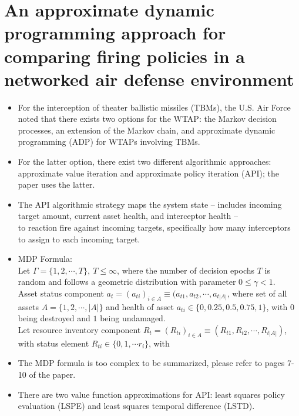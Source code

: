 \documentclass[12pt]{article} %
\renewcommand\le{\leqslant}
\begin{document}
\section*{An approximate dynamic programming approach for comparing firing policies in a networked air defense environment \cite{Summers2020AnAD}}
\begin{itemize}
    \item For the interception of theater ballistic missiles (TBMs), the U.S. Air Force noted that there exists two options for the WTAP: the Markov decision processes, an extension of the Markov chain, and approximate dynamic programming (ADP) for WTAPs involving TBMs.
    \item For the latter option, there exist two different algorithmic approaches: approximate value iteration and approximate policy iteration (API); the paper uses the latter.
    \item The API algorithmic strategy maps the system state -- includes incoming target amount, current asset health, and interceptor health -- \\ to reaction fire against incoming targets, specifically how many interceptors to assign to each incoming target.
    \item MDP Formula:\\
    Let $\Gamma = \{1, 2, \cdots, T\},\ T \le \infty$, where the number of decision epochs $T$ is random and follows a geometric distribution with parameter $0 \le \gamma < 1$. \\Asset status component $a_t = (a_{ti})_{i\in A}\equiv (a_{t1}, a_{t2}, \cdots, a_{t|A|}$, where set of all assets $A = \{1, 2, \cdots, |A|\}$ and health of asset $a_{ti} \in \{0, 0.25, 0.5, 0.75, 1\}$, with $0$ being destroyed and $1$ being undamaged. \\
    Let resource inventory component $R_t = (R_{ti})_{i\in A} \equiv (R_{t1}, R_{t2}, \cdots, R_{t|A|})$, with status element $R_{ti} \in \{0,1,\cdots r_i\}$, with
    \item The MDP formula is too complex to be summarized, please refer to pages 7-10 of the paper.
    \item There are two value function approximations for API: least squares policy evaluation (LSPE) and least squares temporal difference (LSTD).\\
    \vspace{-0.25cm}

\end{itemize}
\end{document}
